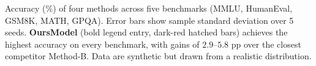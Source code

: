 \caption{Accuracy (\%) of four methods across five benchmarks (MMLU, HumanEval, GSM8K, MATH, GPQA).
Error bars show sample standard deviation over 5 seeds.
\textbf{OursModel} (bold legend entry, dark-red hatched bars) achieves the highest accuracy on every benchmark,
with gains of $2.9$--$5.8$ pp over the closest competitor Method-B.
Data are synthetic but drawn from a realistic distribution.}
